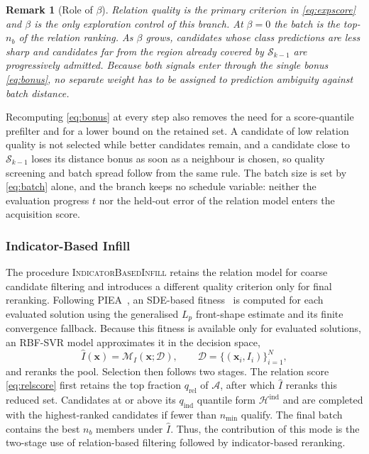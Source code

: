 \documentclass[final,5p,times,twocolumn]{elsarticle}
\newtheorem{remark}{Remark}
\newcommand{\vx}{\mathbf{x}}
\begin{document}
\begin{remark}[Role of $\beta$]
\label{rem:beta}
Relation quality is the primary criterion in \eqref{eq:expscore} and $\beta$ is
the only exploration control of this branch. At $\beta=0$ the batch is the
top-$n_b$ of the relation ranking. As $\beta$ grows, candidates whose class
predictions are less sharp and candidates far from the region already covered by
$\mathcal{S}_{k-1}$ are progressively admitted. Because both signals enter
through the single bonus \eqref{eq:bonus}, no separate weight has to be assigned
to prediction ambiguity against batch distance.
\end{remark}

Recomputing \eqref{eq:bonus} at every step also removes the need for a
score-quantile prefilter and for a lower bound on the retained set. A candidate
of low relation quality is not selected while better candidates remain, and a
candidate close to $\mathcal{S}_{k-1}$ loses its distance bonus as soon as a
neighbour is chosen, so quality screening and batch spread follow from the same
rule. The batch size is set by \eqref{eq:batch} alone, and the branch keeps no
schedule variable: neither the evaluation progress $t$ nor the held-out error of
the relation model enters the acquisition score.

\subsubsection{Indicator-Based Infill}
\label{sec:method:cdis:ind}

The procedure \textsc{IndicatorBasedInfill} retains the relation model for
coarse candidate filtering and
introduces a different quality criterion only for final reranking. Following
PIEA~\cite{ref:piea}, an SDE-based fitness~\cite{ref:sde} is computed for each
evaluated solution using the generalised $L_p$ front-shape estimate and its
finite convergence fallback. Because this fitness is available only for
evaluated solutions, an RBF-SVR model approximates it in the decision space,
\begin{equation}
\widehat I(\vx)=\mathcal{M}_I(\vx;\mathcal{D}),
\qquad
\mathcal{D}=\{(\vx_i,I_i)\}_{i=1}^{N},
\label{eq:svr}
\end{equation}
and reranks the pool. Selection then follows two stages. The relation score
\eqref{eq:relscore} first retains the top fraction $q_{\mathrm{rel}}$ of
$\mathcal{A}$, after which $\widehat I$ reranks this reduced set. Candidates at
or above its $q_{\mathrm{ind}}$ quantile form $\mathcal{H}^{\mathrm{ind}}$ and
are completed with the highest-ranked candidates if fewer than $n_{\min}$
qualify. The final batch contains the best $n_b$ members under $\widehat I$.
Thus, the contribution of this mode is the two-stage use of relation-based
filtering followed by indicator-based reranking.
\end{document}
